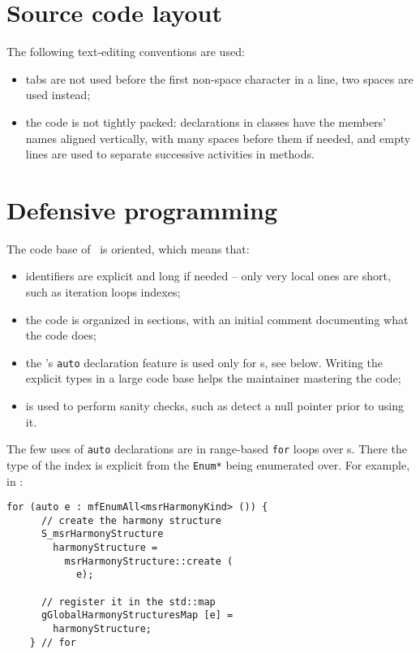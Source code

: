 \section{Source code layout}

The following text-editing conventions are used:
\begin{itemize}
\item tabs are not used before the first non-space character in a line, two spaces are used instead;

\item the code is not tightly packed: declarations in classes have the members' names aligned vertically, with many spaces before them if needed, and empty lines are used to separate successive activities in methods.
\end{itemize}


\section{Defensive programming}

The code base of \xmlToLy\ is  oriented, which means that:
\begin{itemize}
\item identifiers are explicit and long if needed -- only very local ones are short, such as iteration loops indexes;

\item the code is organized in sections, with an initial comment documenting what the code does;

\item the \CPlusplus 's {\tt auto} declaration feature is used only for \enumType s, see below. Writing the explicit types in a large code base helps the maintainer mastering the code;

\item {} is used to perform sanity checks, such as detect a null pointer prior to using it.
\end{itemize}

The few uses of {\tt auto} declarations are in range-based {\tt for} loops over \enumType s. There the type of the index is explicit from the {\tt Enum*} being enumerated over. For example, in :
\begin{lstlisting}[language=CPlusPlus]
    for (auto e : mfEnumAll<msrHarmonyKind> ()) {
      // create the harmony structure
      S_msrHarmonyStructure
        harmonyStructure =
          msrHarmonyStructure::create (
            e);

      // register it in the std::map
      gGlobalHarmonyStructuresMap [e] =
        harmonyStructure;
    } // for
\end{lstlisting}


